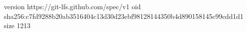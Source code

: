 version https://git-lfs.github.com/spec/v1
oid sha256:c7fd9288b20ab3516404c13d30d23ebf98128144350b4d890158145c99cdd1d1
size 1213
